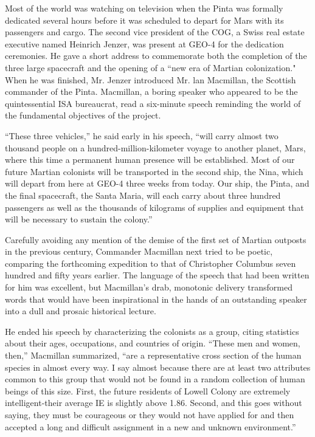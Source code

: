 \documentclass[]{article}
\begin{document}
{Most of the world was watching on television when the Pinta was formally dedicated several hours before it was scheduled to depart for Mars with its passengers and cargo.  The second vice president of the COG, a Swiss real estate executive named Heinrich Jenzer, was present at GEO-4 for the dedication ceremonies.  He gave a short address to commemorate both the completion of the three large spacecraft and the opening of a “new era of Martian colonization."  When he was finished, Mr.  Jenzer introduced Mr.  lan Macmillan, the Scottish commander of the Pinta.  Macmillan, a boring speaker who appeared to be the quintessential ISA bureaucrat, read a six-minute speech reminding the world of the fundamental objectives of the project.

“These three vehicles,” he said early in his speech, “will carry almost two thousand people on a hundred-million-kilometer voyage to another planet, Mars, where this time a permanent human presence will be established.  Most of our future Martian colonists will be transported in the second ship, the Nina, which will depart from here at GEO-4 three weeks from today.  Our ship, the Pinta, and the final spacecraft, the Santa Maria, will each carry about three hundred passengers as well as the thousands of kilograms of supplies and equipment that will be necessary to sustain the colony.”

Carefully avoiding any mention of the demise of the first set of Martian outposts in the previous century, Commander Macmillan next tried to be poetic, comparing the forthcoming expedition to that of Christopher Columbus seven hundred and fifty years earlier.  The language of the speech that had been written for him was excellent, but Macmillan’s drab, monotonic delivery transformed words that would have been inspirational in the hands of an outstanding speaker into a dull and prosaic historical lecture.

He ended his speech by characterizing the colonists as a group, citing statistics about their ages, occupations, and countries of origin.  “These men and women, then,” Macmillan summarized, “are a representative cross section of the human species in almost every way.  I say almost because there are at least two attributes common to this group that would not be found in a random collection of human beings of this size.  First, the future residents of Lowell Colony are extremely intelligent-their average IE is slightly above 1.86.  Second, and this goes without saying, they must be courageous or they would not have applied for and then accepted a long and difficult assignment in a new and unknown environment.”

}
\end{document}
